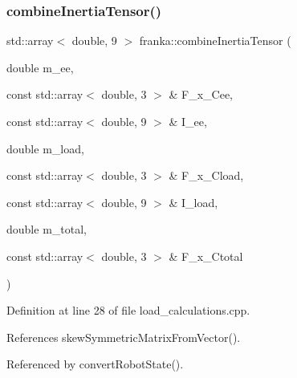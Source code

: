 \subsubsection{\texorpdfstring{combine\+Inertia\+Tensor()}{combineInertiaTensor()}}
{\footnotesize\ttfamily std\+::array$<$ double, 9 $>$ franka\+::combine\+Inertia\+Tensor (\begin{DoxyParamCaption}\item[{double}]{m\+\_\+ee,  }\item[{const std\+::array$<$ double, 3 $>$ \&}]{F\+\_\+x\+\_\+\+Cee,  }\item[{const std\+::array$<$ double, 9 $>$ \&}]{I\+\_\+ee,  }\item[{double}]{m\+\_\+load,  }\item[{const std\+::array$<$ double, 3 $>$ \&}]{F\+\_\+x\+\_\+\+Cload,  }\item[{const std\+::array$<$ double, 9 $>$ \&}]{I\+\_\+load,  }\item[{double}]{m\+\_\+total,  }\item[{const std\+::array$<$ double, 3 $>$ \&}]{F\+\_\+x\+\_\+\+Ctotal }\end{DoxyParamCaption})}



Definition at line 28 of file load\+\_\+calculations.\+cpp.



References skew\+Symmetric\+Matrix\+From\+Vector().



Referenced by convert\+Robot\+State().


